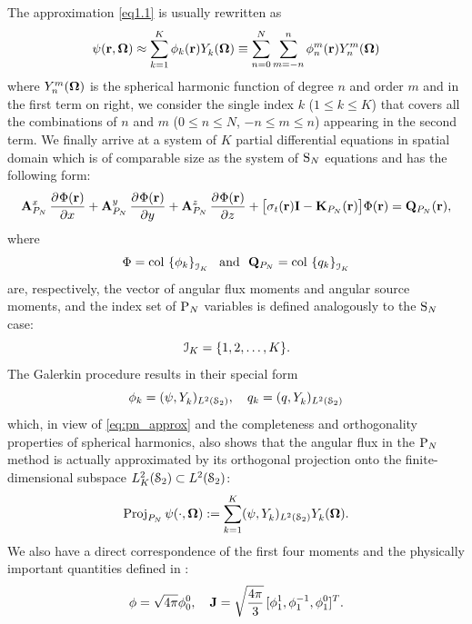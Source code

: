 The approximation \eqref{eq1.1} is usually rewritten as
\begin{equation}\label{eq:pn_approx}
	\psi(\br,\bomega) \approx \sum_{k=1}^{ K} \phi_k(\br)\Y{k}{}(\bomega) \equiv
	\suma[n]{0}{N}\suma[m]{-n}{n}\angmom{n}{m}(\br)\Y{n}{m}(\bomega)
\end{equation}
where $\Y{n}{m}(\bomega)$ is the spherical harmonic function of degree $n$ and order $m$
and in the first term on right, we consider the single index $k$ ($1 \leq k \leq  K$) that covers all the combinations of $n$ and $m$ ($0 \leq n \leq N$, $-n\leq m \leq n$) appearing in the second term. We finally arrive at a system of $ K$
partial differential equations in spatial domain which is of comparable size as the system of $\SN$ equations and has the following form:
\begin{equation}\label{eq:pn1}
	\mat{A}^x_{P_N}\,\pd{\Phi(\br)}{x} + \mat{A}^y_{P_N}\,\pd{\Phi(\br)}{y} + \mat{A}^z_{P_N}\,\pd{\Phi(\br)}{z} +
	\bigl[\sigma_t(\br)\mat{I} - \mat{K}_{P_N}(\br)\bigr]\Phi(\br) = \mat{Q}_{P_N}(\br),
\end{equation}
where 
\begin{equation}\label{eq:pn_vectors}
	\Phi = \col\left\{\phi_k\right\}_{\idxset{K}} \ \text{ and }\ 
	\mat{Q}_{P_N} = \col\left\{q_k\right\}_{\idxset{K}}
\end{equation}
are, respectively, the vector of angular flux
moments and angular source moments, and the index set of $\PN$ variables is defined analogously to the $\SN$ case:
$$
\idxset{K} = \{1,2,\ldots,K\}.
$$
The
Galerkin procedure results in their special form
\begin{equation}\label{eq:pn_angmom}
	\phi_k = (\psi, \Y{k}{})_{\Lp[2](\Sphere)},\quad q_k = (q, \Y{k}{})_{\Lp[2](\Sphere)}
\end{equation}
which, in view of \eqref{eq:pn_approx} and the completeness and orthogonality properties of spherical harmonics, also 
shows that the angular flux in the $\PN$ method is actually approximated by its orthogonal projection onto the
finite-dimensional subspace $\Lp[2]_K(\Sphere)\subset\Lp[2](\Sphere)$:
\begin{equation}\label{eq:PN_proj}
	\Projop\psi(\cdot,\bomega) := \sum_{k=1}^{ K}\ips{\psi}{\Y{k}{}} \Y{k}{}(\bomega).
\end{equation}
We also have a direct correspondence of the first four moments and the physically important quantities defined in
\sref{sec:qoi}:
$$
	\phi = \sqrt{4\pi}\angmom{0}{0},\quad \bJ = \sqrt{\frac{4\pi }{3}}\, [\angmom{1}{1}, \angmom{1}{-1}, \angmom{1}{0}]^T.
$$

